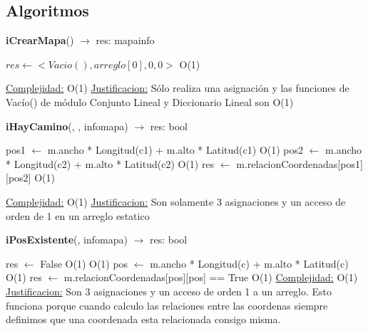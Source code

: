 \subsection{Algoritmos}
\begin{Algoritmos}

\begin{algorithm}[H]{\textbf{iCrearMapa}() $\to$ res: mapainfo}
	\begin{algorithmic}[1]
		\State $res \gets <Vacio(), arreglo[0], 0, 0>$ \Comment O(1)

		\medskip
		\Statex \underline{Complejidad:} O(1)
			\Statex \underline{Justificacion:} Sólo realiza una asignación y las funciones de Vac\'io() de m\'odulo Conjunto Lineal y Diccionario Lineal son O(1)
	\end{algorithmic}
\end{algorithm}

\begin{algorithm}[H]{\textbf{iHayCamino}(, ,  {infomapa}) $\to$ res: bool}
	\begin{algorithmic}[1]
		\State pos1 $\gets$ m.ancho * Longitud(c1) + m.alto * Latitud(c1) \Comment O(1)
		\State pos2 $\gets$ m.ancho * Longitud(c2) + m.alto * Latitud(c2) \Comment O(1)
		\State res $\gets$ m.relacionCoordenadas[pos1][pos2] \Comment O(1)

		\medskip
		\Statex \underline{Complejidad:} O(1)
			\Statex \underline{Justificacion:} Son solamente 3 asignaciones y un acceso de orden de 1 en un arreglo estatico
	\end{algorithmic}
\end{algorithm}

\begin{algorithm}[H]{\textbf{iPosExistente}(,  {infomapa}) $\to$ res: bool}
	\begin{algorithmic}[1]
		\State res $\gets$ False \Comment O(1)
		 \Comment O(1)
		\State pos $\gets$ m.ancho * Longitud(c) + m.alto * Latitud(c) \Comment O(1)
		\State res $\gets$ m.relacionCoordenadas[pos][pos] == True \Comment O(1)
		\Else
		\EndIf
		\medskip
		\Statex \underline{Complejidad:} O(1)
			\Statex \underline{Justificacion:} Son 3 asignaciones y un acceso de orden 1 a un arreglo. Esto funciona porque cuando calculo las relaciones entre las coordenas siempre definimos que una coordenada esta relacionada consigo misma.
	\end{algorithmic}
\end{algorithm}


\end{Algoritmos}
